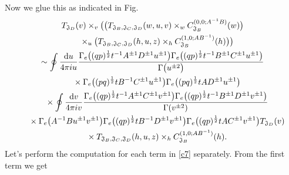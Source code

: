 \documentclass[a4paper,12pt]{article}
\begin{document}
Now we glue this as indicated in Fig.
\begin{gather*}
T_{{\mathfrak J}_D}(v)\times_v \big(\big(T_{{\mathfrak J}_B, {\mathfrak J}_C,{\mathfrak J}_D}(w,u,v)\times_w C^{(0,0;A^{-1}B)}_{{\mathfrak J}_B}(w)\big)\\
\quad{}\times_u\big(T_{{\mathfrak J}_B, {\mathfrak J}_C,{\mathfrak J}_D}(h,u,z)\times_h C^{(1,0;AB^{-1})}_{{\mathfrak J}_B}(h)\big)\big)\\
\sim \oint\frac{{\rm d}u}{4\pi i u} \frac{\Gamma_e\big((q p)^{\frac12 }t^{-1} A^{\pm1} D^{\pm1}u^{\pm1}\big)
\Gamma_e\big((q p)^{\frac12 }t^{-1} B^{\pm1} C^{\pm1}u^{\pm1}\big)}{\Gamma\big(u^{\pm2}\big)}\\
\quad{}\times\Gamma_e\big((pq)^\frac12 t B^{-1} C^{\pm1}u^{\pm1}\big)
\Gamma_e\big((pq)^\frac12 t A D^{\pm1}u^{\pm1}\big) \\
\quad{}\times\oint\frac{{\rm d}v}{4\pi i v} \frac{\Gamma_e\big((q p)^{\frac12 }t^{-1} A^{\pm1} C^{\pm1}v^{\pm1}\big)
\Gamma_e\big((q p)^{\frac12 }t^{-1} B^{\pm1} D^{\pm1}v^{\pm1}\big)}{\Gamma(v^{\pm2})}\\
\quad{}\times\Gamma_e\big( A^{-1}B u^{\pm1} v^{\pm1}\big)\Gamma_e\big((qp)^{\frac12}t B^{-1}D^{\pm1} v^{\pm1}\big)
\Gamma_e\big((q p)^{\frac12}t A C^{\pm1} v^{\pm1}\big)T_{{\mathfrak J}_D}(v)\\
\quad{}\times T_{{\mathfrak J}_B, {\mathfrak J}_C,{\mathfrak J}_D}(h,u,z)\times_h C^{(1,0;AB^{-1})}_{{\mathfrak J}_B}(h) .
\end{gather*}
Let's perform the computation for each term in \eqref{c7} separately. From the first term we get
\end{document}
